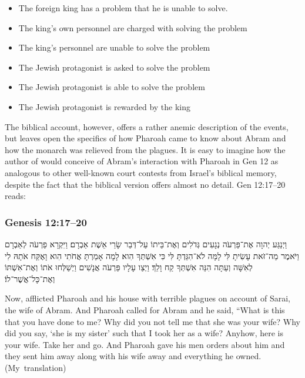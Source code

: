 \begin{SingleSpace}
\begin{itemize}
    \item The foreign king has a problem that he is unable to solve.
    \item The king's own personnel are charged with solving the problem
    \item The king's personnel are unable to solve the problem
    \item The Jewish protagonist is asked to solve the problem
    \item The Jewish protagonist is able to solve the problem
    \item The Jewish protagonist is rewarded by the king
\end{itemize}
\end{SingleSpace}

The biblical account, however, offers a rather anemic description of the events, but leaves open the specifics of how Pharoah came to know about Abram and how the monarch was relieved from the plagues. 
It is easy to imagine how the author of \ga would conceive of Abram's interaction with Pharoah in Gen 12 as analogous to other well-known court contests from Israel's biblical memory, despite the fact that the biblical version offers almost no detail. Gen 12:17--20 reads: 

\subsubsection{Genesis 12:17--20}
\begin{hebrewtext}
    ‏וַיְנַגַּע יְהוָה אֶת־פַּרְעֹה נְגָעִים גְּדֹלִים וְאֶת־בֵּיתוֹ עַל־דְּבַר שָׂרַי אֵשֶׁת אַבְרָם׃
    וַיִּקְרָא פַרְעֹה לְאַבְרָם וַיֹּאמֶר מַה־זֹּאת עָשִׂיתָ לִּי לָמָּה לֹא־הִגַּדְתָּ לִּי כִּי אִשְׁתְּךָ הִוא׃
    לָמָה אָמַרְתָּ אֲחֹתִי הִוא וָאֶקַּח אֹתָהּ לִי לְאִשָּׁה וְעַתָּה הִנֵּה אִשְׁתְּךָ קַח וָלֵךְ׃ 
    וַיְצַו עָלָיו פַּרְעֹה אֲנָשִׁים וַיְשַׁלְּחוּ אֹתוֹ וְאֶת־אִשְׁתּוֹ וְאֶת־כָּל־אֲשֶׁר־לוֹ׃
\end{hebrewtext}

\begin{translation}
    Now, \yahweh afflicted Pharoah and his house with terrible plagues on account of Sarai, the wife of Abram. 
    And Pharoah called for Abram and he said, ``What is this that you have done to me? Why did you not tell me that she was your wife? 
    Why did you say, `she is my sister' such that I took her as a wife? Anyhow, here is your wife. Take her and go. 
    And Pharoah gave his men orders about him and they sent him away along with his wife away and everything he owned. (My~translation)
\end{translation}

